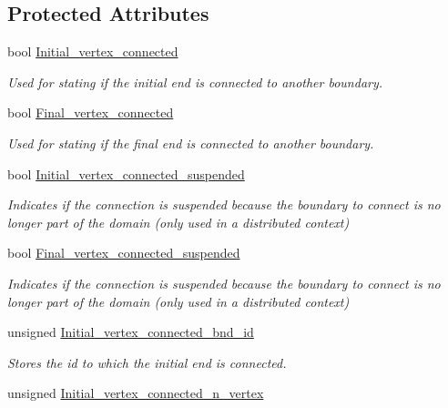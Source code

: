 \subsection*{Protected Attributes}
\begin{DoxyCompactItemize}
\item 
bool \hyperlink{classoomph_1_1TriangleMeshCurveSection_a6f831c694ed3f3e64259c2aef6833fe1}{Initial\+\_\+vertex\+\_\+connected}
\begin{DoxyCompactList}\small\item\em Used for stating if the initial end is connected to another boundary. \end{DoxyCompactList}\item 
bool \hyperlink{classoomph_1_1TriangleMeshCurveSection_a1569f7a60d4f68916a13b177e746a58d}{Final\+\_\+vertex\+\_\+connected}
\begin{DoxyCompactList}\small\item\em Used for stating if the final end is connected to another boundary. \end{DoxyCompactList}\item 
bool \hyperlink{classoomph_1_1TriangleMeshCurveSection_a7daa8be52f85035581f4f7a7a3653457}{Initial\+\_\+vertex\+\_\+connected\+\_\+suspended}
\begin{DoxyCompactList}\small\item\em Indicates if the connection is suspended because the boundary to connect is no longer part of the domain (only used in a distributed context) \end{DoxyCompactList}\item 
bool \hyperlink{classoomph_1_1TriangleMeshCurveSection_a0732c70f8c0516c4019cc231fc5be050}{Final\+\_\+vertex\+\_\+connected\+\_\+suspended}
\begin{DoxyCompactList}\small\item\em Indicates if the connection is suspended because the boundary to connect is no longer part of the domain (only used in a distributed context) \end{DoxyCompactList}\item 
unsigned \hyperlink{classoomph_1_1TriangleMeshCurveSection_afb52c283347f6032971b1eb34be7c1cf}{Initial\+\_\+vertex\+\_\+connected\+\_\+bnd\+\_\+id}
\begin{DoxyCompactList}\small\item\em Stores the id to which the initial end is connected. \end{DoxyCompactList}\item 
unsigned \hyperlink{classoomph_1_1TriangleMeshCurveSection_a7a9bd3a85377bd49b2bd6588d6d4f128}{Initial\+\_\+vertex\+\_\+connected\+\_\+n\+\_\+vertex}

\end{DoxyCompactItemize}
